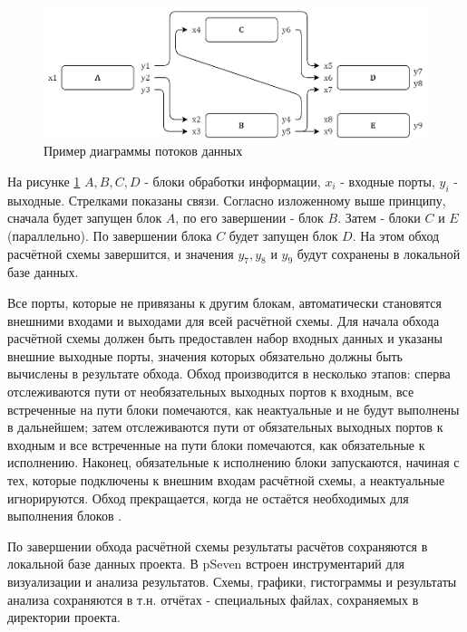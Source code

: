 \begin{figure}[h]
    \centering
    \includegraphics[width=\textwidth]{figures/dataflow.png}
    \caption{Пример диаграммы потоков данных}
    \label{fig:dataflow}
\end{figure}

На рисунке \ref{fig:dataflow} $A, B, C, D$ - блоки обработки информации, $x_i$ - входные порты, $y_i$ - выходные. Стрелками показаны связи. Согласно изложенному выше принципу, сначала будет запущен блок $A$, по его завершении - блок $B$. Затем - блоки $C$ и $E$ (параллельно). По завершении блока $C$ будет запущен блок $D$. На этом обход расчётной схемы завершится, и значения $y_7, y_8$ и $y_9$ будут сохранены в локальной базе данных.

\begin{remark}
Все порты, которые не привязаны к другим блокам, автоматически становятся внешними входами и выходами для всей расчётной схемы. Для начала обхода расчётной схемы должен быть предоставлен набор входных данных и указаны внешние выходные порты, значения которых обязательно должны быть вычислены в результате обхода. Обход производится в несколько этапов: сперва отслеживаются пути от необязательных выходных портов к входным, все встреченные на пути блоки помечаются, как неактуальные и не будут выполнены в дальнейшем; затем отслеживаются пути от обязательных выходных портов к входным и все встреченные на пути блоки помечаются, как обязательные к исполнению. Наконец, обязательные к исполнению блоки запускаются, начиная с тех, которые подключены к внешним входам расчётной схемы, а неактуальные игнорируются. Обход прекращается, когда не остаётся необходимых для выполнения блоков \cite{Nazarenko2015}. 
\end{remark}

По завершении обхода расчётной схемы результаты расчётов сохраняются в локальной базе данных проекта. В pSeven встроен инструментарий для визуализации и анализа результатов. Схемы, графики, гистограммы и результаты анализа сохраняются в т.н. отчётах - специальных файлах, сохраняемых в директории проекта.

